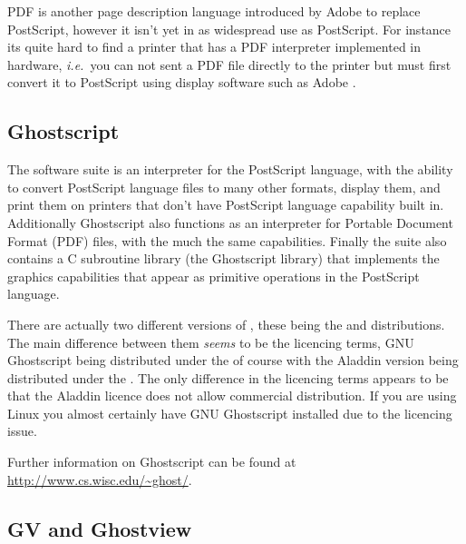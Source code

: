 \documentclass[twoside,11pt]{starlink}
\begin{document}
PDF is another page description language introduced by Adobe to
replace PostScript, however it isn't yet in as widespread use as
PostScript. For instance its quite hard to find a printer that has a
PDF interpreter implemented in hardware, \emph{i.e.\ }you can not sent
a PDF file directly to the printer but must first convert it to
PostScript using display software such as Adobe
.

\subsection{Ghostscript\label{sc15_gs}}

The 
software suite is an interpreter for the PostScript language, with the
ability to convert PostScript language files to many other formats,
display them, and print them on printers that don't have PostScript
language capability built in. Additionally Ghostscript also functions
as an interpreter for Portable Document Format (PDF) files, with the
much the same capabilities. Finally the suite also contains a C
subroutine library (the Ghostscript library) that implements the
graphics capabilities that appear as primitive operations in the
PostScript language.

There are actually two different versions of
,
these being the
and
distributions. The main difference between them \emph{seems} to be the
licencing terms, GNU Ghostscript being distributed under the
 of
course with the Aladdin version being distributed under the
. The
only difference in the licencing terms appears to be that the Aladdin
licence does not allow commercial distribution. If you are using Linux
you almost certainly have GNU Ghostscript installed due to the
licencing issue.

Further information on Ghostscript can be found at
\url{http://www.cs.wisc.edu/~ghost/}.

\subsection{GV and Ghostview\label{sc15_gv}}
\end{document}
